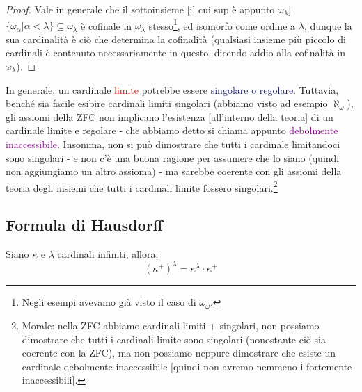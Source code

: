 \documentclass[11pt]{scrartcl}
\begin{document}
\begin{proof}
	Vale in generale che il sottoinsieme [il cui sup è appunto $\omega_\lambda$] $\{\omega_\alpha | \alpha < \lambda\} \subseteq \omega_\lambda$ è cofinale in $\omega_{\lambda}$ stesso\footnote{Negli esempi avevamo già visto il caso di $\omega_\omega$.}, ed 
	isomorfo come ordine a $\lambda$, dunque la sua cardinalità è ciò che determina la cofinalità (qualsiasi insieme più piccolo di cardinali è contenuto necessariamente in questo, dicendo addio alla cofinalità in $\omega_\lambda$).
\end{proof}

\begin{note}
	In generale, un cardinale \textcolor{red}{limite} potrebbe essere \textcolor{MidnightBlue}{singolare o regolare}. Tuttavia, benché sia facile esibire cardinali limiti singolari (abbiamo visto ad esempio $\aleph_\omega$), gli assiomi della ZFC non implicano l'esistenza [all'interno della teoria]
	di un cardinale limite e regolare - che abbiamo detto si chiama appunto \textcolor{purple}{debolmente inaccessibile}. Insomma, non si può dimostrare che tutti i cardinale limitandoci sono singolari - e non c'è una buona ragione per assumere che lo siano (quindi non aggiungiamo un altro assioma) - ma sarebbe coerente
	con gli assiomi della teoria degli insiemi che tutti i cardinali limite fossero singolari.\footnote{Morale: nella ZFC abbiamo cardinali limiti + singolari, non possiamo dimostrare che tutti i cardinali limite sono singolari (nonostante ciò sia coerente con la ZFC), ma non possiamo neppure dimostrare che esiste
	un cardinale debolmente inaccessibile [quindi non avremo nemmeno i fortemente inaccessibili].}
\end{note}

\pagebreak
\subsection{Formula di Hausdorff}

\begin{proposition}
	Siano $\kappa$ e $\lambda$ cardinali infiniti, allora:
	\[ (\kappa^+)^\lambda = \kappa^{\lambda} \cdot \kappa^+
		\]
\end{proposition}
\end{document}
